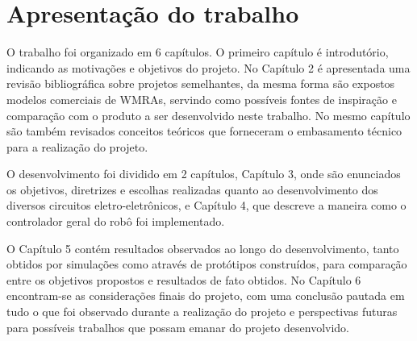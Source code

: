 
\section{Apresentação do trabalho}

O trabalho foi organizado em 6 capítulos. O primeiro capítulo é 
introdutório, indicando as motivações e objetivos do projeto. 
No Capítulo 2 é apresentada uma revisão bibliográfica sobre projetos
semelhantes, da mesma forma são expostos modelos comerciais de WMRAs, 
servindo como possíveis fontes de inspiração e comparação com o produto 
a ser desenvolvido neste trabalho. No mesmo capítulo são também revisados
conceitos teóricos que forneceram o embasamento técnico para a 
realização do projeto. 

O desenvolvimento foi dividido em 2 capítulos, Capítulo 3, onde
são enunciados os objetivos, diretrizes e escolhas realizadas quanto 
ao desenvolvimento dos diversos circuitos eletro-eletrônicos, e 
Capítulo 4, que descreve a maneira como o controlador geral do robô foi
implementado.

O Capítulo 5 contém resultados observados ao longo do desenvolvimento,
tanto obtidos por simulações como através de protótipos construídos, 
para comparação entre os objetivos propostos e resultados de fato obtidos.
No Capítulo 6 encontram-se as considerações finais do projeto, com 
uma conclusão pautada em tudo o que foi observado durante a realização
do projeto e perspectivas futuras para possíveis trabalhos que possam 
emanar do projeto desenvolvido. 